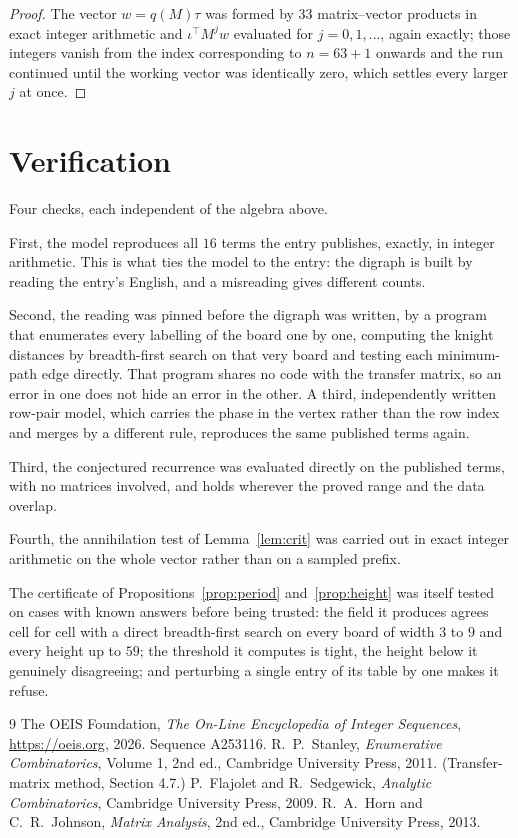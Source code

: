 \documentclass[11pt,a4paper]{article}
\theoremstyle{plain}
\theoremstyle{definition}
\begin{document}
\begin{proof}
The vector $w=q(M)\tau$ was formed by $33$ matrix--vector products in exact integer
arithmetic and $\iota^{\!\top}M^{j}w$ evaluated for $j=0,1,\dots$, again exactly; those
integers vanish from the index corresponding to $n=63+1$ onwards and the run continued
until the working vector was identically zero, which settles every larger $j$ at once.
\end{proof}

\section{Verification}

Four checks, each independent of the algebra above.

First, the model reproduces all $16$ terms the entry publishes, exactly, in integer
arithmetic. This is what ties the model to the entry: the digraph is built by reading the
entry's English, and a misreading gives different counts.

Second, the reading was pinned before the digraph was written, by a program that enumerates
every labelling of the board one by one, computing the knight distances by breadth-first
search on that very board and testing each minimum-path edge directly. That program shares no
code with the transfer matrix, so an error in one does not hide an error in the other. A
third, independently written row-pair model, which carries the phase in the vertex rather than
the row index and merges by a different rule, reproduces the same published terms again.

Third, the conjectured recurrence was evaluated directly on the published terms, with no
matrices involved, and holds wherever the proved range and the data overlap.

Fourth, the annihilation test of Lemma~\ref{lem:crit} was carried out in exact integer
arithmetic on the whole vector rather than on a sampled prefix.

The certificate of Propositions~\ref{prop:period} and~\ref{prop:height} was itself tested
on cases with known answers before being trusted: the field it produces agrees cell for cell
with a direct breadth-first search on every board of width $3$ to $9$ and every height up to
$59$; the threshold it computes is tight, the height below it genuinely disagreeing; and
perturbing a single entry of its table by one makes it refuse.

\begin{thebibliography}{9}
 The OEIS Foundation, \emph{The On-Line Encyclopedia of Integer
Sequences}, \url{https://oeis.org}, 2026. Sequence A253116.
 R.~P.~Stanley, \emph{Enumerative Combinatorics}, Volume 1, 2nd ed.,
Cambridge University Press, 2011. (Transfer-matrix method, Section 4.7.)
 P.~Flajolet and R.~Sedgewick, \emph{Analytic Combinatorics}, Cambridge
University Press, 2009.
 R.~A.~Horn and C.~R.~Johnson, \emph{Matrix Analysis}, 2nd ed., Cambridge
University Press, 2013.
\end{thebibliography}
\end{document}
